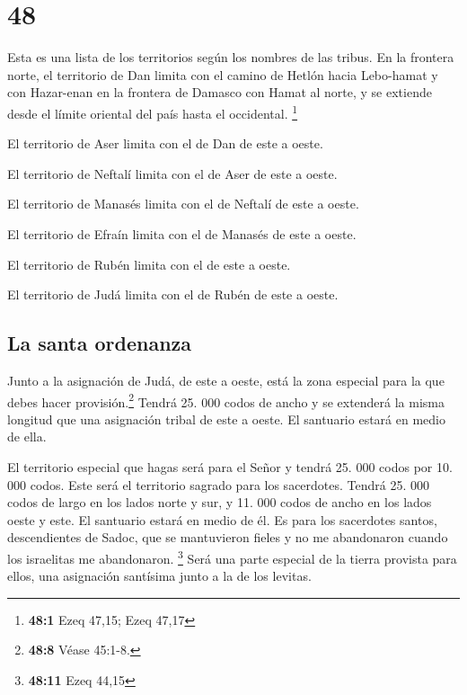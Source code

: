 \hypertarget{section-47}{%
\section{48}\label{section-47}}

 Esta es una lista de los territorios según los nombres de
las tribus. En la frontera norte, el territorio de Dan limita con el
camino de Hetlón hacia Lebo-hamat y con Hazar-enan en la frontera de
Damasco con Hamat al norte, y se extiende desde el límite oriental del
país hasta el occidental. \footnote{\textbf{48:1} Ezeq 47,15; Ezeq 47,17}

 El territorio de Aser limita con el de Dan de este a
oeste.

 El territorio de Neftalí limita con el de Aser de este a
oeste.

 El territorio de Manasés limita con el de Neftalí de este
a oeste.

 El territorio de Efraín limita con el de Manasés de este
a oeste.

 El territorio de Rubén limita con el de este a oeste.

 El territorio de Judá limita con el de Rubén de este a
oeste.

\hypertarget{la-santa-ordenanza}{%
\subsection{La santa ordenanza}\label{la-santa-ordenanza}}

 Junto a la asignación de Judá, de este a oeste, está la
zona especial para la que debes hacer provisión.\footnote{\textbf{48:8}
  Véase 45:1-8.} Tendrá 25. 000 codos de ancho y se extenderá la misma
longitud que una asignación tribal de este a oeste. El santuario estará
en medio de ella.

 El territorio especial que hagas será para el Señor y
tendrá 25. 000 codos por 10. 000 codos.  Este será el
territorio sagrado para los sacerdotes. Tendrá 25. 000 codos de largo en
los lados norte y sur, y 11. 000 codos de ancho en los lados oeste y
este. El santuario estará en medio de él.  Es para los
sacerdotes santos, descendientes de Sadoc, que se mantuvieron fieles y
no me abandonaron cuando los israelitas me abandonaron. \footnote{\textbf{48:11}
  Ezeq 44,15}  Será una parte especial de la tierra
provista para ellos, una asignación santísima junto a la de los levitas.

